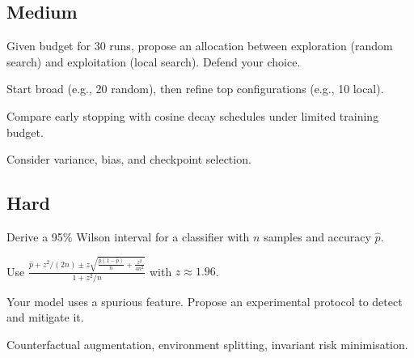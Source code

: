 \subsection*{Medium}

\begin{exercisebox}[medium]
\begin{problem}
Given budget for 30 runs, propose an allocation between exploration (random search) and exploitation (local search). Defend your choice.
\end{problem}
\begin{hintbox}
Start broad (e.g., 20 random), then refine top configurations (e.g., 10 local).
\end{hintbox}
\end{exercisebox}


\begin{exercisebox}[medium]
\begin{problem}
Compare early stopping with cosine decay schedules under limited training budget.
\end{problem}
\begin{hintbox}
Consider variance, bias, and checkpoint selection.
\end{hintbox}
\end{exercisebox}


\subsection*{Hard}

\begin{exercisebox}[hard]
\begin{problem}
Derive a 95\% Wilson interval for a classifier with $n$ samples and accuracy $\hat{p}$.
\end{problem}
\begin{hintbox}
Use $\frac{\hat{p}+z^2/(2n) \pm z\sqrt{\frac{\hat{p}(1-\hat{p})}{n}+\frac{z^2}{4n^2}}}{1+z^2/n}$ with $z\approx1.96$.
\end{hintbox}
\end{exercisebox}


\begin{exercisebox}[hard]
\begin{problem}
Your model uses a spurious feature. Propose an experimental protocol to detect and mitigate it.
\end{problem}
\begin{hintbox}
Counterfactual augmentation, environment splitting, invariant risk minimisation.
\end{hintbox}
\end{exercisebox}




